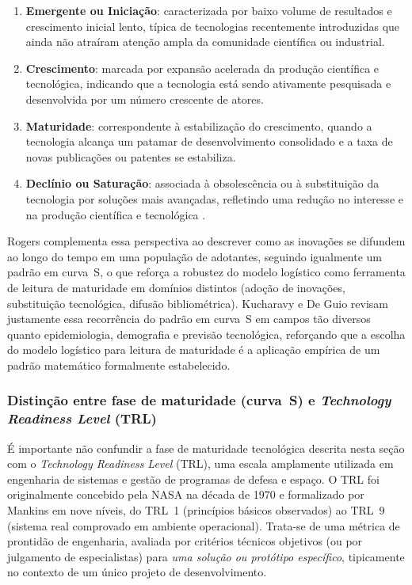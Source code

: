 \documentclass[12pt, a4paper]{article}
\begin{document}
  \begin{enumerate}[label=(\roman*)]
    \item \textbf{Emergente ou Iniciação}: caracterizada por baixo volume de resultados e
    crescimento inicial lento, típica de tecnologias recentemente introduzidas
    que ainda não atraíram atenção ampla da comunidade científica ou industrial.

    \item \textbf{Crescimento}: marcada por expansão acelerada da produção
    científica e tecnológica, indicando que a tecnologia está sendo ativamente
    pesquisada e desenvolvida por um número crescente de atores.

    \item \textbf{Maturidade}: correspondente à estabilização do crescimento,
    quando a tecnologia alcança um patamar de desenvolvimento consolidado e
    a taxa de novas publicações ou patentes se estabiliza.

    \item \textbf{Declínio ou Saturação}: associada à obsolescência ou à substituição da
    tecnologia por soluções mais avançadas, refletindo uma redução no interesse
    e na produção científica e tecnológica \cite{foster1986}.
  \end{enumerate}

  Rogers \cite{rogers2003} complementa essa perspectiva ao descrever como as
inovações se difundem ao longo do tempo em uma população de adotantes, seguindo
igualmente um padrão em curva~S, o que reforça a robustez do modelo logístico
como ferramenta de leitura de maturidade em domínios distintos (adoção de
inovações, substituição tecnológica, difusão bibliométrica). Kucharavy e De
Guio \cite{kucharavy2011} revisam justamente essa recorrência do padrão em
curva~S em campos tão diversos quanto epidemiologia, demografia e previsão
tecnológica, reforçando que a escolha do modelo logístico para leitura de
maturidade é a aplicação empírica de um padrão matemático formalmente estabelecido.

    \subsubsection{Distinção entre fase de maturidade (curva~S) e \textit{Technology Readiness Level} (TRL)}

  É importante não confundir a fase de maturidade tecnológica descrita nesta
seção com o \textit{Technology Readiness Level} (TRL), uma escala amplamente
utilizada em engenharia de sistemas e gestão de programas de defesa e espaço.
O TRL foi originalmente concebido pela NASA na década de 1970 e formalizado por
Mankins \cite{mankins1995} em nove níveis, do TRL~1 (princípios básicos
observados) ao TRL~9 (sistema real comprovado em ambiente operacional). Trata-se
de uma métrica de prontidão de engenharia, avaliada por critérios técnicos
objetivos (ou por julgamento de especialistas) para \emph{uma solução ou
protótipo específico}, tipicamente no contexto de um único projeto de
desenvolvimento.
\end{document}
